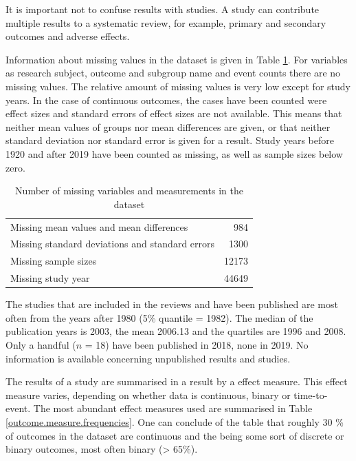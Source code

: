 \documentclass[11pt,a4paper,twoside]{book}\usepackage[]{graphicx}\usepackage[]{color}
\begin{document}
It is important not to confuse results with studies. A study can contribute multiple results to a systematic review, for example, primary and secondary outcomes and adverse effects. 

\vspace{0mm}
Information about missing values in the dataset is given in Table \ref{missing}. For variables as research subject, outcome and subgroup name and event counts there are no missing values. The relative amount of missing values is very low except for study years. In the case of continuous outcomes, the cases have been counted were effect sizes and standard errors of effect sizes are not available. This means that neither mean values of groups nor mean differences are given, or that neither standard deviation nor standard error is given for a result. Study years before 1920 and after 2019 have been counted as missing, as well as sample sizes below zero.

\begin{table}[ht]
\centering
\begingroup\footnotesize
\begin{tabular}{lr}
  \hline
  \hline
Missing mean values and mean differences & 984 \\ 
  Missing standard deviations and standard errors & 1300 \\ 
  Missing sample sizes & 12173 \\ 
  Missing study year & 44649 \\ 
   \hline
\end{tabular}
\endgroup
\caption{Number of missing variables and measurements in the dataset} 
\label{missing}
\end{table}


The studies that are included in the reviews and have been published are most often from the years after 1980 (5\% quantile = 1982). The median of the publication years is 2003, the mean 2006.13 and the quartiles are 1996 and 2008. Only a handful ($n$ = 18) have been published in 2018, none in 2019. No information is available concerning unpublished results and studies.

\vspace{0mm}
The results of a study are summarised in a result by a effect measure. This effect measure varies, depending on whether data is continuous, binary or time-to-event. The most abundant effect measures used are summarised in Table \ref{outcome.measure.frequencies}. One can conclude of the table that roughly 30 \% of outcomes in the dataset are continuous and the being some sort of discrete or binary outcomes, most often binary (> 65\%).
\end{document}

